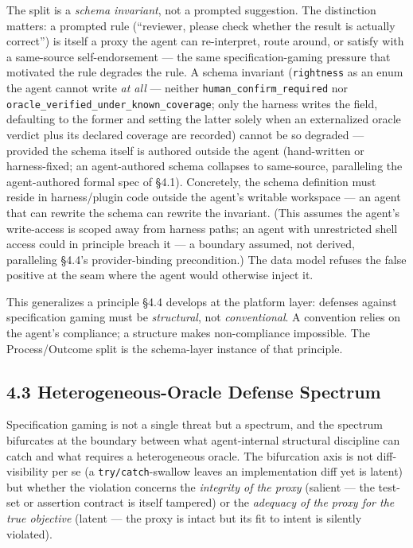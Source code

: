 \documentclass[
  11pt,
]{article}
\begin{document}
The split is a \emph{schema invariant}, not a prompted suggestion. The
distinction matters: a prompted rule (``reviewer, please check whether
the result is actually correct'') is itself a proxy the agent can
re-interpret, route around, or satisfy with a same-source
self-endorsement --- the same specification-gaming pressure that
motivated the rule degrades the rule. A schema invariant
(\texttt{rightness} as an enum the agent cannot write \emph{at all} ---
neither \texttt{human\_confirm\_required} nor
\texttt{oracle\_verified\_under\_known\_coverage}; only the harness
writes the field, defaulting to the former and setting the latter solely
when an externalized oracle verdict plus its declared coverage are
recorded) cannot be so degraded --- provided the schema itself is
authored outside the agent (hand-written or harness-fixed; an
agent-authored schema collapses to same-source, paralleling the
agent-authored formal spec of §4.1). Concretely, the schema definition
must reside in harness/plugin code outside the agent's writable
workspace --- an agent that can rewrite the schema can rewrite the
invariant. (This assumes the agent's write-access is scoped away from
harness paths; an agent with unrestricted shell access could in
principle breach it --- a boundary assumed, not derived, paralleling
§4.4's provider-binding precondition.) The data model refuses the false
positive at the seam where the agent would otherwise inject it.

This generalizes a principle §4.4 develops at the platform layer:
defenses against specification gaming must be \emph{structural}, not
\emph{conventional}. A convention relies on the agent's compliance; a
structure makes non-compliance impossible. The Process/Outcome split is
the schema-layer instance of that principle.

\subsection{4.3 Heterogeneous-Oracle Defense
Spectrum}\label{heterogeneous-oracle-defense-spectrum}

Specification gaming is not a single threat but a spectrum, and the
spectrum bifurcates at the boundary between what agent-internal
structural discipline can catch and what requires a heterogeneous
oracle. The bifurcation axis is not diff-visibility per se (a
\texttt{try/catch}-swallow leaves an implementation diff yet is latent)
but whether the violation concerns the \emph{integrity of the proxy}
(salient --- the test-set or assertion contract is itself tampered) or
the \emph{adequacy of the proxy for the true objective} (latent --- the
proxy is intact but its fit to intent is silently violated).
\end{document}
